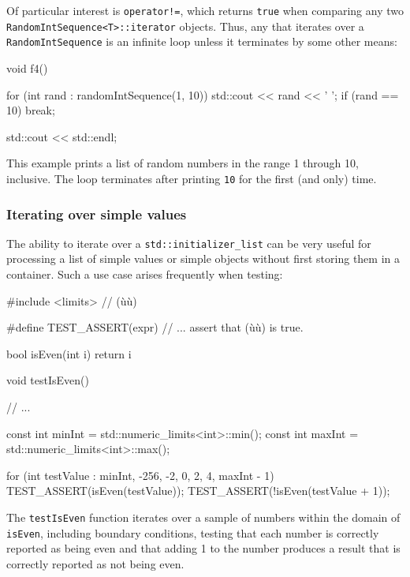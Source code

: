 {{Of particular interest is \lstinline|operator!=|, which returns
\lstinline!true! when comparing any two
\lstinline!RandomIntSequence<T>::iterator! objects. Thus, any
 that iterates over a
\lstinline!RandomIntSequence! is an infinite loop unless it terminates by
some other means:

\begin{emcppslisting}
void f4()
{
    for (int rand : randomIntSequence(1, 10))
    {
        std::cout << rand << ' ';
        if (rand == 10) { break; }
    }

    std::cout << std::endl;
}
\end{emcppslisting}
    

\noindent This example prints a list of random numbers in the range 1 through 10,
inclusive. The loop terminates after printing \lstinline!10! for the first
(and only) time.

\subsubsection[Iterating over simple values]{Iterating over simple values}\label{iterating-over-simple-values}

The ability to iterate over a \lstinline!std::initializer_list! can be
very useful for processing a list of simple values or simple objects
without first storing them in a container. Such a use case arises
frequently when testing:

\begin{emcppslisting}
#include <limits>  // (ù{}ù)

#define TEST_ASSERT(expr)  // ... assert that (ù{}ù) is true.

bool isEven(int i)
{
    return i %
}

void testIsEven()
{
    // ...

    const int minInt = std::numeric_limits<int>::min();
    const int maxInt = std::numeric_limits<int>::max();

    for (int testValue : {minInt, -256, -2, 0, 2, 4, maxInt - 1})
    {
        TEST_ASSERT(isEven(testValue));
        TEST_ASSERT(!isEven(testValue + 1));
    }
}
\end{emcppslisting}
    

\noindent The \lstinline!testIsEven! function iterates over a sample of numbers
within the domain of \lstinline!isEven!, including boundary conditions,
testing that each number is correctly reported as being even and that
adding 1 to the number produces a result that is correctly reported as
not being even.

}}

